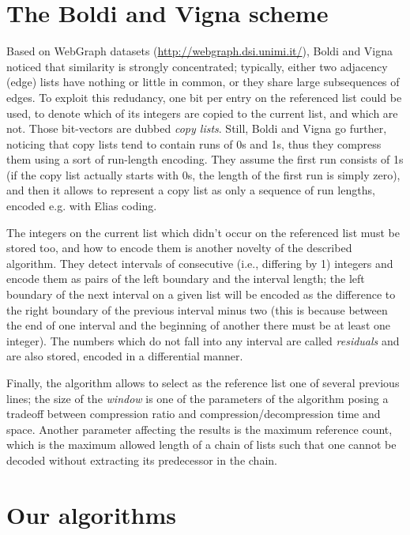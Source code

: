 \documentclass[envcountsame]{llncs}
\begin{document}
\section{The Boldi and Vigna scheme}
\label{sec:bv}


Based on WebGraph datasets (\url{http://webgraph.dsi.unimi.it/}), Boldi and Vigna noticed 
that similarity is strongly concentrated; typically, either two adjacency (edge) lists 
have nothing or little in common, or they share large subsequences of edges.  
To exploit this redudancy, one bit per entry on the referenced list could be used, 
to denote which of its integers are copied to the current list, and which are not.  
Those bit-vectors are dubbed {\em copy lists}.  Still, Boldi and Vigna go further, 
noticing that copy lists tend to contain runs of 0s and 1s, thus they compress them 
using a sort of run-length encoding.  They assume the first run consists of 1s 
(if the copy list actually starts with 0s, the length of the first run is simply zero), 
and then it allows to represent a copy list as only a sequence of run lengths, 
encoded e.g. with Elias coding.

The integers on the current list which didn't occur on the referenced list must 
be stored too, and how to encode them is another novelty of the described 
algorithm.  They detect intervals of consecutive (i.e., differing by 1) integers
and encode them as pairs of the left boundary and the interval length; 
the left boundary of the next interval on a given list will be encoded as the 
difference to the right boundary of the previous interval minus two (this is 
because between the end of one interval and the beginning of another there 
must be at least one integer).
The numbers which do not fall into any interval are called {\em residuals} 
and are also stored, encoded in a differential manner.

Finally, the algorithm allows to select as the reference list one of several 
previous lines; the size of the {\em window} is one of the parameters of the 
algorithm posing a tradeoff between compression ratio and compression/decompression 
time and space.
Another parameter affecting the results is the maximum reference count, 
which is the maximum allowed length of a chain of lists such that one cannot be 
decoded without extracting its predecessor in the chain.


\section{Our algorithms}
\label{sec:our}
\end{document}
